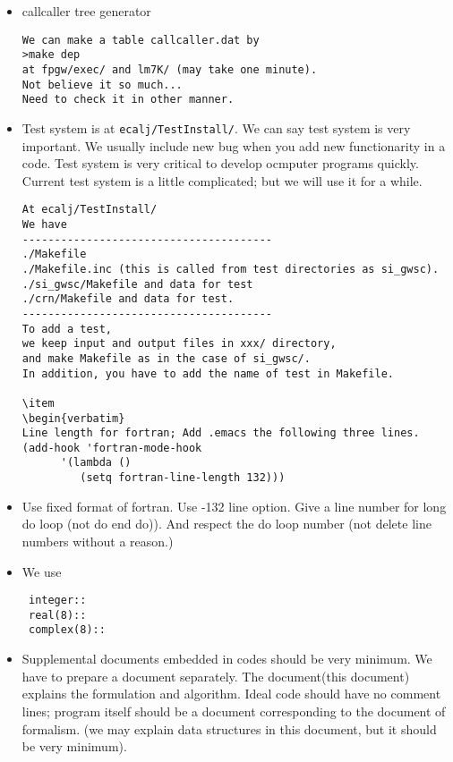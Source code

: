 \documentclass[a4paper,10pt,fleqn]{article}
\begin{document}
\begin{itemize}
\item callcaller tree generator
\begin{verbatim}
We can make a table callcaller.dat by
>make dep 
at fpgw/exec/ and lm7K/ (may take one minute).
Not believe it so much...
Need to check it in other manner.
\end{verbatim}

\item Test system is at \verb#ecalj/TestInstall/#.
We can say test system is very important. We usually include new bug
when you add new functionarity in a code. Test system is very critical
to develop ocmputer programs quickly.  Current test system is a little
      complicated; but we will use it for a while.
\begin{verbatim}
At ecalj/TestInstall/
We have
---------------------------------------
./Makefile
./Makefile.inc (this is called from test directories as si_gwsc).
./si_gwsc/Makefile and data for test
./crn/Makefile and data for test.
---------------------------------------
To add a test,
we keep input and output files in xxx/ directory,
and make Makefile as in the case of si_gwsc/.
In addition, you have to add the name of test in Makefile.

\item
\begin{verbatim}
Line length for fortran; Add .emacs the following three lines.
(add-hook 'fortran-mode-hook
	  '(lambda ()
	     (setq fortran-line-length 132)))
\end{verbatim}

       
 \item Use fixed format of fortran. Use -132 line option. Give a line number for long do
       loop (not do end do)). And respect the do loop number (not delete
       line numbers without a reason.)

 \item We use
\begin{verbatim}
 integer::
 real(8)::
 complex(8)::
\end{verbatim}

\item Supplemental documents embedded in codes should be very minimum.
We have to prepare a document separately. The document(this document)
explains the formulation and algorithm. 
Ideal code should have no comment lines; program itself should be a document
corresponding to the document of formalism.
(we may explain data structures in this document, but it should be very minimum).

\end{itemize}
\end{document}
